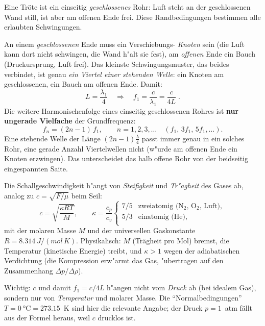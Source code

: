 

Eine Tröte ist ein einseitig \emph{geschlossenes} Rohr: Luft steht an der
geschlossenen Wand still, ist aber am offenen Ende frei. Diese
Randbedingungen bestimmen alle erlaubten Schwingungen.

\begin{werkzeugkasten}
An einem \emph{geschlossenen} Ende muss ein Verschiebungs- \emph{Knoten}
sein (die Luft kann dort nicht schwingen, die Wand h"alt sie fest), am
\emph{offenen} Ende ein Bauch (Druckursprung, Luft frei). Das kleinste
Schwingungsmuster, das beides verbindet, ist genau \emph{ein Viertel einer
stehenden Welle}: ein Knoten am geschlossenen, ein Bauch am offenen Ende.
Damit:
\begin{equation}
  L=\frac{\lambda_1}{4}\quad\Rightarrow\quad
  f_1=\frac{c}{\lambda_1}=\frac{c}{4L}\;.
\end{equation}
Die weitere Harmonischenfolge eines einseitig geschlossenen Rohres ist
\textbf{nur ungerade Vielfache} der Grundfrequenz:
\begin{equation}
  f_n=(2n-1)\,f_1,\qquad n=1,2,3,\dots
  \quad(f_1,\,3f_1,\,5f_1,\dots).
\end{equation}
Eine stehende Welle der Länge $(2n-1)\frac{\lambda}{4}$ passt immer genau in
ein solches Rohr, eine gerade Anzahl Viertelwellen nicht (w"urde am offenen
Ende ein Knoten erzwingen). Das unterscheidet das halb offene Rohr von der
beidseitig eingespannten Saite.
\end{werkzeugkasten}

\begin{werkzeugkasten}
Die Schallgeschwindigkeit h"angt von \emph{Steifigkeit} und \emph{Tr"agheit}
des Gases ab, analog zu $c=\sqrt{F/\mu}$ beim Seil:
\begin{equation}
  c=\sqrt{\frac{\kappa R T}{M}},\qquad
  \kappa=\frac{c_p}{c_v}
  \begin{cases}
    7/5 &\text{zweiatomig (N$_2$, O$_2$, Luft)},\\
    5/3 &\text{einatomig (He)},\\
  \end{cases}
\end{equation}
mit der molaren Masse $M$ und der universellen Gaskonstante
$R=\qty{8.314}{J/(mol\,K)}$. Physikalisch: $M$ (Trägheit pro Mol) bremst, die
Temperatur (kinetische Energie) treibt, und $\kappa>1$ wegen der adiabatischen
Verdichtung (die Kompression erw"armt das Gas, "ubertragen auf den
Zusammenhang $\Delta p/\Delta\rho$).

Wichtig: $c$ und damit $f_1=c/4L$ h"angen nicht vom \emph{Druck} ab (bei
idealem Gas), sondern nur von \emph{Temperatur} und molarer Masse. Die
``Normalbedingungen'' $T=\qty{0}{\celsius}=273.15$~K sind hier die relevante
Angabe; der Druck $p=1$~atm fällt aus der Formel heraus, weil $c$ drucklos
ist.
\end{werkzeugkasten}

